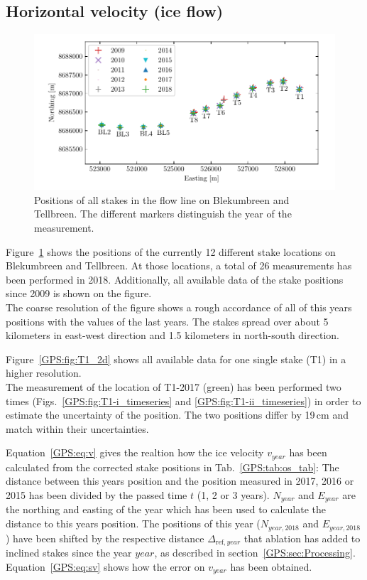 \subsection{Horizontal velocity (ice flow)}

\begin{figure}[H]
    \centering
    \includegraphics[width=\textwidth]{./figs/stakePositions.pdf}
    \caption{Positions of all stakes in the flow line on Blekumbreen and Tellbreen.
    The different markers distinguish the year of the measurement.}
    \label{GPS:fig:stakepos}
\end{figure}

Figure~\ref{GPS:fig:stakepos} shows the positions of the currently 12 different stake locations
on Blekumbreen and Tellbreen.
At those locations, a total of 26 measurements has been performed in 2018.
Additionally, all available data of the stake positions since 2009 is shown on the figure.\\
The coarse resolution of the figure shows a rough accordance of all of this years positions with the values 
of the last years.
The stakes spread over about 5 kilometers in east-west direction and 1.5 kilometers in north-south direction.

Figure~\ref{GPS:fig:T1_2d} shows all available data for one single stake (T1) in a higher resolution.\\
The measurement of the location of T1-2017 (green) has been performed two times
(Figs.~\ref{GPS:fig:T1-i_timeseries} and \ref{GPS:fig:T1-ii_timeseries})
in order to estimate the uncertainty
of the position.
The two positions differ by 19\,cm and match within their uncertainties.

Equation~\ref{GPS:eq:v} gives the realtion how the ice velocity $v_{year}$ has been calculated from the corrected stake positions in
Tab.~\ref{GPS:tab:os_tab}:
The distance between this years position and the position measured in 2017, 2016 or 2015 has been divided
by the passed time $t$ (1, 2 or 3 years).
$N_{year}$ and $E_{year}$ are the northing and easting of the year which has been used to calculate the distance to
this years position.
The positions of this year ($N_{year, 2018}$ and $E_{year, 2018}$) have been shifted by the respective distance
$\Delta_{\text{ref}, year}$ that ablation has
added to inclined stakes since the year $year$, as described in section~\ref{GPS:sec:Processing}.
Equation~\ref{GPS:eq:sv} shows how the error on $v_{year}$ has been obtained.


